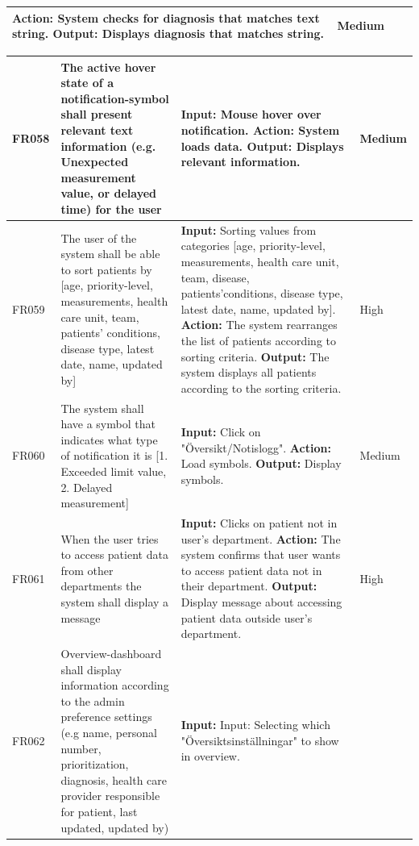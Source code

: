 \documentclass{scrreprt}
\begin{document}
\begin{center}
\begin{tabularx}{\linewidth}{| l | X | X | l |}
\newline \textbf{Action:} System checks for diagnosis that matches text string.
\newline \textbf{Output:} Displays diagnosis that matches string. & Medium \\ 
\hline
\end{tabularx}
\begin{tabularx}{\linewidth}{| l | X | X | l |}
\hline
FR058 & The active hover state of a notification-symbol shall present relevant text information (e.g. Unexpected measurement value, or delayed time) for the user   & \textbf{Input:} Mouse hover over notification.
\newline \textbf{Action:} System loads data.
\newline \textbf{Output:} Displays relevant information. & Medium \\ 
\hline
FR059 & The user of the system shall be able to sort patients by [age, priority-level, measurements, health care unit, team, patients’ conditions, disease type, latest date, name, updated by] & \textbf{Input:} Sorting values from categories [age, priority-level, measurements, health care unit, team, disease, patients’conditions, disease type, latest date, name, updated by].
\newline \textbf{Action:} The system rearranges the list of patients according to sorting criteria.
\newline \textbf{Output:} The system displays all patients according to the sorting criteria. & High \\ 
\hline
FR060 & The system shall have a symbol that indicates what type of notification it is [1. Exceeded limit value, 2. Delayed measurement] & \textbf{Input:} Click on "Översikt/Notislogg".
\newline \textbf{Action:} Load symbols.
\newline \textbf{Output:} Display symbols. & Medium \\ 
\hline
FR061 & When the user tries to access patient data from other departments the system shall display a message & \textbf{Input:} Clicks on patient not in user's department.
\newline \textbf{Action:} The system confirms that user wants to access patient data not in their department.
\newline \textbf{Output:} Display message about accessing patient data outside user's department. & High \\ 
\hline
FR062 & Overview-dashboard shall display information according to the admin preference settings (e.g name, personal number, prioritization, diagnosis, health care provider responsible for patient, last updated, updated by) & \textbf{Input:} Input: Selecting which "Översiktsinställningar" to show in overview.

\end{tabularx}
\end{center}
\end{document}
